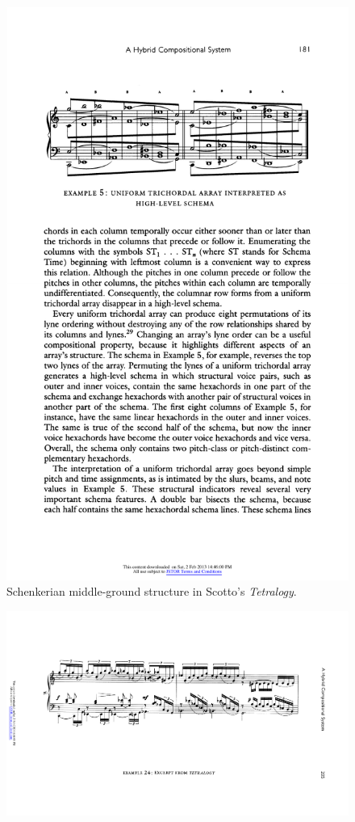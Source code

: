\begin{example}
\begin{figure}[H]
		\includegraphics[width=6.5in]{figures/scotto-schenker1.pdf}
		\caption[Schenkerian middle-ground structure in Scotto's \emph{Tetralogy}]{Schenkerian middle-ground structure in Scotto's \emph{Tetralogy}.}
    	\label{fig:scotto-schenker1}
	\end{figure}
	\begin{figure}[H]
    	\centering
    	\includegraphics[width=6.5in]{figures/scotto-music1.pdf}

\end{figure}
\end{example}
